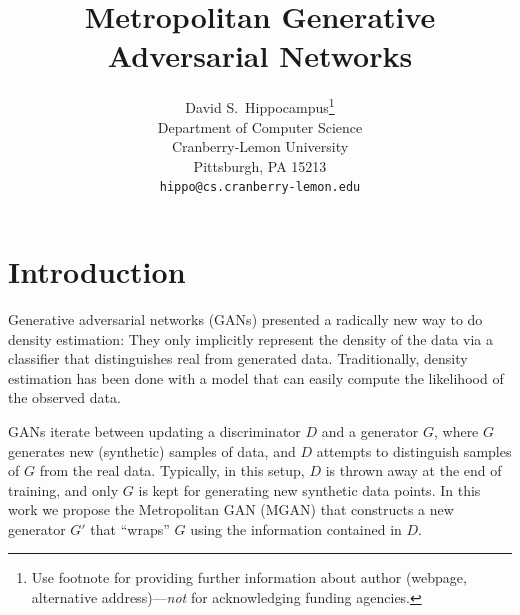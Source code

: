 \documentclass{article}
\title{Metropolitan Generative Adversarial Networks}
\author{
  David S.~Hippocampus\thanks{Use footnote for providing further
    information about author (webpage, alternative
    address)---\emph{not} for acknowledging funding agencies.} \\
  Department of Computer Science\\
  Cranberry-Lemon University\\
  Pittsburgh, PA 15213 \\
  \texttt{hippo@cs.cranberry-lemon.edu} \\
}
\begin{document}

\maketitle


\section{Introduction}

Generative adversarial networks (GANs) presented a radically new way to do density estimation:
They only implicitly represent the density of the data via a classifier that distinguishes real from generated data.
Traditionally, density estimation has been done with a model that can easily compute the likelihood of the observed data.

GANs iterate between updating a discriminator $D$ and a generator $G$, where $G$ generates new (synthetic) samples of data, and $D$ attempts to distinguish samples of $G$ from the real data.
Typically, in this setup, $D$ is thrown away at the end of training, and only $G$ is kept for generating new synthetic data points.
In this work we propose the Metropolitan GAN (MGAN) that constructs a new generator $G'$ that ``wraps'' $G$ using the information contained in $D$.
\end{document}
